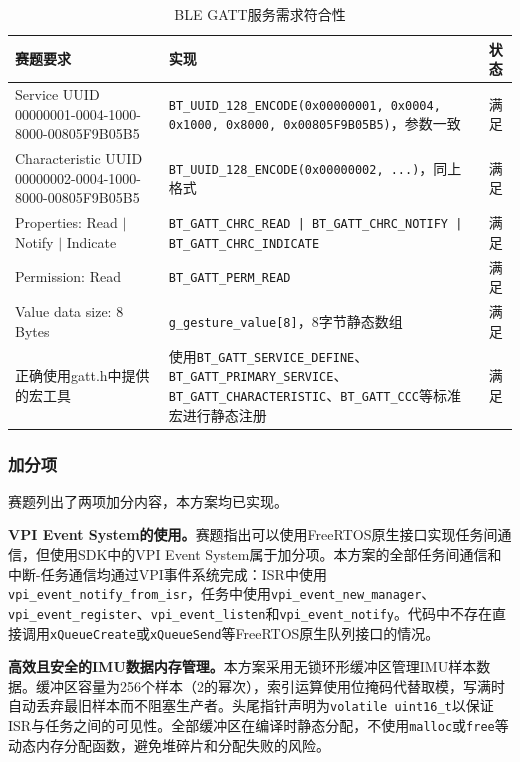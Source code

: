 \documentclass[lettersize,journal]{IEEEtran}
\begin{document}
\begin{table}[!t]
    \centering
    \caption{BLE GATT服务需求符合性}
    \label{tab:req_ble}
    \begin{tabular}{p{5.5cm}p{8.3cm}p{1.2cm}}
        \toprule
        \textbf{赛题要求} & \textbf{实现} & \textbf{状态} \\
        \midrule
        Service UUID 00000001-0004-1000-8000-00805F9B05B5 & \texttt{BT\_UUID\_128\_ENCODE(0x00000001, 0x0004, 0x1000, 0x8000, 0x00805F9B05B5)}，参数一致 & 满足 \\
        Characteristic UUID 00000002-0004-1000-8000-00805F9B05B5 & \texttt{BT\_UUID\_128\_ENCODE(0x00000002, ...)}，同上格式 & 满足 \\
        Properties: Read $|$ Notify $|$ Indicate & \texttt{BT\_GATT\_CHRC\_READ | BT\_GATT\_CHRC\_NOTIFY | BT\_GATT\_CHRC\_INDICATE} & 满足 \\
        Permission: Read & \texttt{BT\_GATT\_PERM\_READ} & 满足 \\
        Value data size: 8 Bytes & \texttt{g\_gesture\_value[8]}，8字节静态数组 & 满足 \\
        正确使用gatt.h中提供的宏工具 & 使用\texttt{BT\_GATT\_SERVICE\_DEFINE}、\texttt{BT\_GATT\_PRIMARY\_SERVICE}、\texttt{BT\_GATT\_CHARACTERISTIC}、\texttt{BT\_GATT\_CCC}等标准宏进行静态注册 & 满足 \\
        \bottomrule
    \end{tabular}
\end{table}

\subsubsection{加分项}

赛题列出了两项加分内容，本方案均已实现。

\textbf{VPI Event System的使用。}赛题指出可以使用FreeRTOS原生接口实现任务间通信，但使用SDK中的VPI Event System属于加分项。本方案的全部任务间通信和中断-任务通信均通过VPI事件系统完成：ISR中使用\texttt{vpi\_event\_notify\_from\_isr}，任务中使用\texttt{vpi\_event\_new\_manager}、\texttt{vpi\_event\_register}、\texttt{vpi\_event\_listen}和\texttt{vpi\_event\_notify}。代码中不存在直接调用\texttt{xQueueCreate}或\texttt{xQueueSend}等FreeRTOS原生队列接口的情况。

\textbf{高效且安全的IMU数据内存管理。}本方案采用无锁环形缓冲区管理IMU样本数据。缓冲区容量为256个样本（2的幂次），索引运算使用位掩码代替取模，写满时自动丢弃最旧样本而不阻塞生产者。头尾指针声明为\texttt{volatile uint16\_t}以保证ISR与任务之间的可见性。全部缓冲区在编译时静态分配，不使用\texttt{malloc}或\texttt{free}等动态内存分配函数，避免堆碎片和分配失败的风险。
\end{document}
